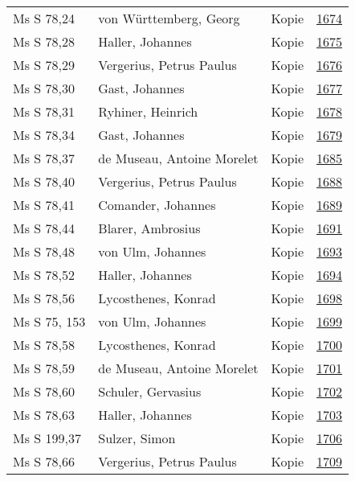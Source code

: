 \documentclass[10pt,a4paper,landscape]{report}
\begin{document}
\begin{longtable}{p{16cm}p{4cm}lr}
Ms S 78,24	&	von Württemberg, Georg	&	Kopie	&	\href{http://130.60.24.72/assignment/1674}{1674}\\
Ms S 78,28	&	Haller, Johannes	&	Kopie	&	\href{http://130.60.24.72/assignment/1675}{1675}\\
Ms S 78,29	&	Vergerius, Petrus Paulus	&	Kopie	&	\href{http://130.60.24.72/assignment/1676}{1676}\\
Ms S 78,30	&	Gast, Johannes	&	Kopie	&	\href{http://130.60.24.72/assignment/1677}{1677}\\
Ms S 78,31	&	Ryhiner, Heinrich	&	Kopie	&	\href{http://130.60.24.72/assignment/1678}{1678}\\
Ms S 78,34	&	Gast, Johannes	&	Kopie	&	\href{http://130.60.24.72/assignment/1679}{1679}\\
Ms S 78,37	&	de Museau, Antoine Morelet	&	Kopie	&	\href{http://130.60.24.72/assignment/1685}{1685}\\
Ms S 78,40	&	Vergerius, Petrus Paulus	&	Kopie	&	\href{http://130.60.24.72/assignment/1688}{1688}\\
Ms S 78,41	&	Comander, Johannes	&	Kopie	&	\href{http://130.60.24.72/assignment/1689}{1689}\\
Ms S 78,44	&	Blarer, Ambrosius	&	Kopie	&	\href{http://130.60.24.72/assignment/1691}{1691}\\
Ms S 78,48	&	von Ulm, Johannes	&	Kopie	&	\href{http://130.60.24.72/assignment/1693}{1693}\\
Ms S 78,52	&	Haller, Johannes	&	Kopie	&	\href{http://130.60.24.72/assignment/1694}{1694}\\
Ms S 78,56	&	Lycosthenes, Konrad	&	Kopie	&	\href{http://130.60.24.72/assignment/1698}{1698}\\
Ms S 75, 153	&	von Ulm, Johannes	&	Kopie	&	\href{http://130.60.24.72/assignment/1699}{1699}\\
Ms S 78,58	&	Lycosthenes, Konrad	&	Kopie	&	\href{http://130.60.24.72/assignment/1700}{1700}\\
Ms S 78,59	&	de Museau, Antoine Morelet	&	Kopie	&	\href{http://130.60.24.72/assignment/1701}{1701}\\
Ms S 78,60	&	Schuler, Gervasius	&	Kopie	&	\href{http://130.60.24.72/assignment/1702}{1702}\\
Ms S 78,63	&	Haller, Johannes	&	Kopie	&	\href{http://130.60.24.72/assignment/1703}{1703}\\
Ms S 199,37	&	Sulzer, Simon	&	Kopie	&	\href{http://130.60.24.72/assignment/1706}{1706}\\
Ms S 78,66	&	Vergerius, Petrus Paulus	&	Kopie	&	\href{http://130.60.24.72/assignment/1709}{1709}\\

\end{longtable}
\end{document}
